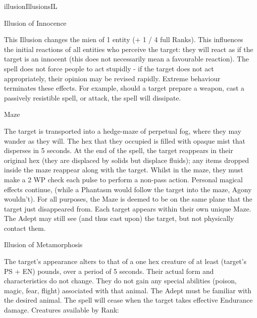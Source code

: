\begin{college}[1.4]{illusion}{Illusions}{IL}
\begin{spell}[S-9]{Illusion of Innocence}

\begin{effects}
This Illusion changes the mien of 1 entity (+ 1 / 4 full Ranks). This
influences the initial reactions of all entities who perceive the
target: they will react as if the target is an innocent (this does not
necessarily mean a favourable reaction). The spell does not force
people to act stupidly - if the target does not act appropriately,
their opinion may be revised rapidly. Extreme behaviour terminates
these effects. For example, should a target prepare a weapon, cast a
passively resistible spell, or attack, the spell will dissipate.
\end{effects}
\end{spell}

\begin{spell}[S-10]{Maze}

\begin{effects}
The target is transported into a hedge-maze of perpetual fog, where
they may wander as they will. The hex that they occupied is filled
with opaque mist that disperses in 5 seconds. At the end of the spell,
the target reappears in their original hex (they are displaced by
solids but displace fluids); any items dropped inside the maze
reappear along with the target. Whilst in the maze, they must make a 2
\x WP check each pulse to perform a non-pass action. Personal magical
effects continue, (\eg while a Phantasm would follow the target into
the maze, Agony wouldn't). For all purposes, the Maze is deemed to be
on the same plane that the target just disappeared from. Each target
appears within their own unique Maze. The Adept may still see (and
thus cast upon) the target, but not physically contact them.
\end{effects}
\end{spell}

\begin{spell}[S-11]{Illusion of Metamorphosis}

\begin{effects}
The target's appearance alters to that of a one hex creature of at
least (target's PS + EN) pounds, over a period of 5 seconds. Their
actual form and characteristics do not change. They do not gain any
special abilities (\eg poison, magic, fear, flight) associated with
that animal. The Adept must be familiar with the desired animal. The
spell will cease when the target takes effective Endurance damage.
Creatures available by Rank:


\end{effects}
\end{spell}
\end{college}
